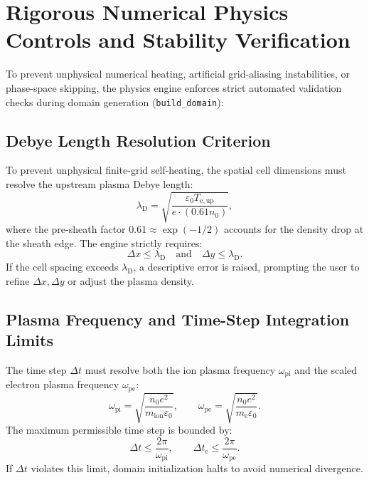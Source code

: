 \documentclass[11pt,a4paper]{article}
\begin{document}
\section{Rigorous Numerical Physics Controls and Stability Verification}

To prevent unphysical numerical heating, artificial grid-aliasing instabilities, or phase-space skipping, the physics engine enforces strict automated validation checks during domain generation (\texttt{build\_domain}):

\subsection{Debye Length Resolution Criterion}
To prevent unphysical finite-grid self-heating, the spatial cell dimensions must resolve the upstream plasma Debye length:
\begin{equation}
    \lambda_{\mathrm{D}} = \sqrt{\frac{\varepsilon_0 T_{\mathrm{e,up}}}{e \cdot (0.61 n_0)}},
\end{equation}
where the pre-sheath factor $0.61 \approx \exp(-1/2)$ accounts for the density drop at the sheath edge. The engine strictly requires:
\begin{equation}
    \Delta x \le \lambda_{\mathrm{D}} \quad \text{and} \quad \Delta y \le \lambda_{\mathrm{D}}.
\end{equation}
If the cell spacing exceeds $\lambda_{\mathrm{D}}$, a descriptive error is raised, prompting the user to refine $\Delta x, \Delta y$ or adjust the plasma density.

\subsection{Plasma Frequency and Time-Step Integration Limits}
The time step $\Delta t$ must resolve both the ion plasma frequency $\omega_{\mathrm{pi}}$ and the scaled electron plasma frequency $\omega_{\mathrm{pe}}$:
\begin{equation}
    \omega_{\mathrm{pi}} = \sqrt{\frac{n_0 e^2}{m_{\mathrm{ion}} \varepsilon_0}}, \qquad
    \omega_{\mathrm{pe}} = \sqrt{\frac{n_0 e^2}{m_{\mathrm{e}} \varepsilon_0}}.
\end{equation}
The maximum permissible time step is bounded by:
\begin{equation}
    \Delta t \le \frac{2\pi}{\omega_{\mathrm{pi}}}, \qquad \Delta t_{\mathrm{e}} \le \frac{2\pi}{\omega_{\mathrm{pe}}}.
\end{equation}
If $\Delta t$ violates this limit, domain initialization halts to avoid numerical divergence.
\end{document}
